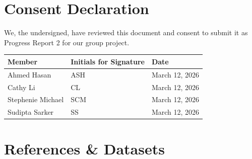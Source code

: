 \documentclass[11pt]{article}
\begin{document}
\section{Consent Declaration}

We, the undersigned, have reviewed this document and consent to submit it as Progress Report 2 for our group project.

\begin{table}[H]
\centering
\begin{tabular}{l l l}
\toprule
\textbf{Member} & \textbf{Initials for Signature} & \textbf{Date} \\
\midrule
Ahmed Hasan & ASH & March 12, 2026 \\
Cathy Li & CL & March 12, 2026 \\
Stephenie Michael & SCM & March 12, 2026 \\
Sudipta Sarker & SS & March 12, 2026 \\
\bottomrule
\end{tabular}
\end{table}

\vspace{-0.3em}

\appendix
\section{References \& Datasets}
\end{document}
